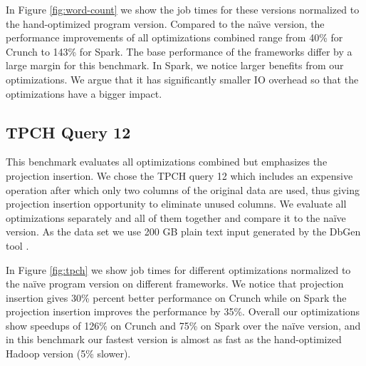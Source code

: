 In Figure \ref{fig:word-count} we show the job times for these versions
normalized to the hand-optimized program version. Compared to the na\"{\i}ve
version, the performance improvements of
all optimizations combined range from 40\% for Crunch
to 143\% for Spark. The base performance of the frameworks differ
by a large margin for this benchmark. In
Spark, we notice larger benefits from our optimizations. We argue that it has
significantly smaller IO overhead so that the optimizations have a bigger
impact. 

\subsection{TPCH Query 12}
\label{subsec:tpch-query-12}

This benchmark evaluates all optimizations combined but emphasizes the
projection insertion. We chose the TPCH query 12 which includes an expensive
 operation after which only two columns of the original data are
used, thus giving projection insertion opportunity to eliminate unused columns.
We evaluate all optimizations separately and all of them together and compare it
to the na\"{i}ve version. As the data set we use 200 GB plain text input
generated by the DbGen tool \cite{tpch}.

In Figure \ref{fig:tpch} we show job times for different optimizations
normalized to the na\"{i}ve program version on different frameworks. We notice
that projection insertion gives 30\% percent better performance on Crunch while
on Spark the projection insertion improves the performance by 35\%. Overall our
optimizations show speedups of 126\% on Crunch and 75\% on Spark over the na\"{i}ve
version, and in this benchmark our fastest version is almost as fast as the
hand-optimized Hadoop version (5\% slower).
\\

